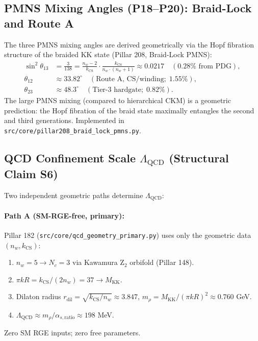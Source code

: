 \documentclass[12pt,a4paper]{article}
\begin{document}
\subsection{PMNS Mixing Angles (P18--P20): Braid-Lock and Route A}

The three PMNS mixing angles are derived geometrically via the Hopf fibration
structure of the braided KK state (Pillar 208, Braid-Lock PMNS):
\begin{align}
  \sin^2\theta_{13} &= \frac{3}{138} = \frac{n_w - 2}{k_\mathrm{CS}} \cdot \frac{k_\mathrm{CS}}{n_w \cdot (n_w+1)} \approx 0.0217 \quad (0.28\% \text{ from PDG}), \\
  \theta_{12} &\approx 33.82^\circ \quad (\text{Route A, CS/winding}; \; 1.55\%), \\
  \theta_{23} &\approx 48.3^\circ \quad (\text{Tier-3 hardgate}; \; 0.82\%).
\end{align}
The large PMNS mixing (compared to hierarchical CKM) is a geometric prediction:
the Hopf fibration of the braid state maximally entangles the second and third
generations.  Implemented in \texttt{src/core/pillar208\_braid\_lock\_pmns.py}.

\subsection{QCD Confinement Scale \texorpdfstring{$\Lambda_\mathrm{QCD}$}{Lambda\_QCD} (Structural Claim S6)}

Two independent geometric paths determine $\Lambda_\mathrm{QCD}$:

\paragraph{Path A (SM-RGE-free, primary):}
Pillar 182 (\texttt{src/core/qcd\_geometry\_primary.py}) uses only the geometric
data $(n_w, k_\mathrm{CS})$:
\begin{enumerate}
  \item $n_w = 5 \to N_c = 3$ via Kawamura Z$_2$ orbifold (Pillar 148).
  \item $\pi k R = k_\mathrm{CS}/(2 n_w) = 37 \to M_\mathrm{KK}$.
  \item Dilaton radius $r_\mathrm{dil} = \sqrt{k_\mathrm{CS}/n_w} \approx 3.847$,
        $m_\rho = M_\mathrm{KK}/(\pi k R)^2 \approx 0.760$ GeV.
  \item $\Lambda_\mathrm{QCD} \approx m_\rho / \alpha_{s,\mathrm{ratio}} \approx 198$ MeV.
\end{enumerate}
Zero SM RGE inputs; zero free parameters.
\end{document}
